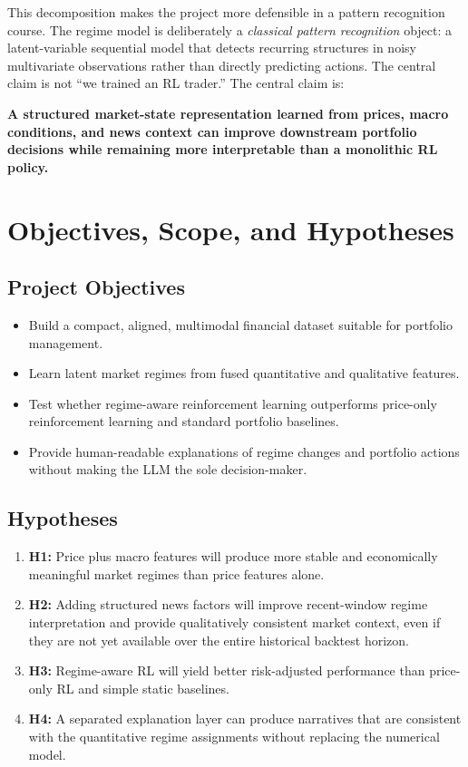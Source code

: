 \documentclass[11pt,a4paper]{article}
\begin{document}
This decomposition makes the project more defensible in a pattern recognition course.
The regime model is deliberately a \emph{classical pattern recognition} object: a latent-variable sequential model that detects recurring structures in noisy multivariate observations rather than directly predicting actions.
The central claim is not ``we trained an RL trader.''
The central claim is:

\begin{summarybox}
\centering
\textbf{\color{navy}A structured market-state representation learned from prices, macro conditions, and news context can improve downstream portfolio decisions while remaining more interpretable than a monolithic RL policy.}
\end{summarybox}

\section{Objectives, Scope, and Hypotheses}

\subsection{Project Objectives}

\begin{itemize}[leftmargin=1.4em]
  \item Build a compact, aligned, multimodal financial dataset suitable for portfolio management.
  \item Learn latent market regimes from fused quantitative and qualitative features.
  \item Test whether regime-aware reinforcement learning outperforms price-only reinforcement learning and standard portfolio baselines.
  \item Provide human-readable explanations of regime changes and portfolio actions without making the LLM the sole decision-maker.
\end{itemize}

\subsection{Hypotheses}

\begin{enumerate}[leftmargin=1.5em]
  \item \textbf{H1:} Price plus macro features will produce more stable and economically meaningful market regimes than price features alone.
  \item \textbf{H2:} Adding structured news factors will improve recent-window regime interpretation and provide qualitatively consistent market context, even if they are not yet available over the entire historical backtest horizon.
  \item \textbf{H3:} Regime-aware RL will yield better risk-adjusted performance than price-only RL and simple static baselines.
  \item \textbf{H4:} A separated explanation layer can produce narratives that are consistent with the quantitative regime assignments without replacing the numerical model.
\end{enumerate}
\end{document}
